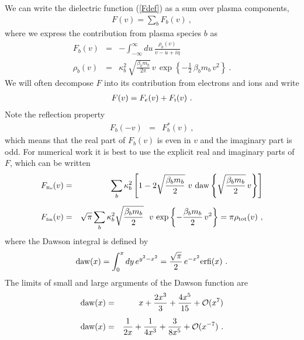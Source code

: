 \documentclass[preprint,12pt,eqsecnum,nofootinbib,amsmath,amssymb]{revtex4}
\newcommand{\smI}{{\rm\scriptscriptstyle I}}
\newcommand{\smRe}{{\rm\scriptscriptstyle Re}}
\newcommand{\smIm}{{\rm\scriptscriptstyle Im}}
\begin{document}
{{We can write the dielectric function (\ref{Fdef}) as a sum over plasma
components,
\begin{eqnarray}
  F(v)={\sum}_b F_b(v) \ ,
\end{eqnarray}
where we express the contribution from plasma species $b$ as
\begin{eqnarray}
  F_b(v) 
  &=& 
\label{Fbdef}
  -\int_{-\infty}^\infty du\, \frac{\rho_b(v)}{v - u + i\eta}
\\[5pt]
  \rho_b(v) 
  &=& 
  \kappa_b^2\,\sqrt{\frac{\beta_b m_b}{2\pi}}\, v\,
  \exp\!\left\{-\frac{1}{2}\,\beta_b m_b\, v^2\right\} \ .
\label{barrhob}
\end{eqnarray} 
We will often decompose $F$ into its contribution from
electrons and ions and write
\begin{eqnarray}
 F(v)=F_e(v) + F_\smI(v) \ .
\end{eqnarray}
Note the reflection property
\begin{eqnarray}
  F_b(-v) 
  &=& 
  F_b^*(v) \ ,
\label{Fbreflect}
\end{eqnarray}
which means that the real part of $F_b(v)$ is even in $v$ and the
imaginary part is odd. For numerical work it is best to use the
explicit real and imaginary parts of $F$, which can be written
\begin{eqnarray}
  F_\smRe(v)
  &=& 
  \sum_b \kappa_b^2 
  \left[1 - 2 \sqrt{\frac{\beta_b m_b}{2}} ~v~
  {\rm daw}\left\{\sqrt{\frac{\beta_b m_b}{2}}\,v 
  \right\} \right]
\label{Fru}
\\[5pt]
  F_\smIm(v)
  &=&
  \sqrt{\pi} \sum_b \kappa_b^2 
  \sqrt{\frac{\beta_b m_b}{2}}~~
  v\, \exp\left\{-\frac{\beta_b m_b}
  {2}\, v^2\right\} = \pi  \rho_{\rm tot}(v)  \ ,
\label{Fiu}
\end{eqnarray}
where the Dawson integral is defined by 
  \begin{eqnarray}
  {\rm daw}(x) = \int_0^x dy\, 
  e^{y^2 - x^2} = \frac{\sqrt{\pi}}{2}\, e^{-x^2}
  {\rm erfi}(x) \ .
  \end{eqnarray}
The limits of small and large arguments of the Dawson function
are
\begin{eqnarray}
  {\rm daw}(x) 
  &=& 
  x +\frac{2 x^3}{3} + \frac{4 x^5}{15} + {\cal O}(x^7) 
\label{dawA}
\\[5pt]
  {\rm daw}(x)
  &=&
  \frac{1}{2x} +\frac{1}{4 x^3} + \frac{3}{8x^5} + {\cal O}(x^{-7}) \ .
\label{dawB}
\end{eqnarray}

}}
\end{document}
